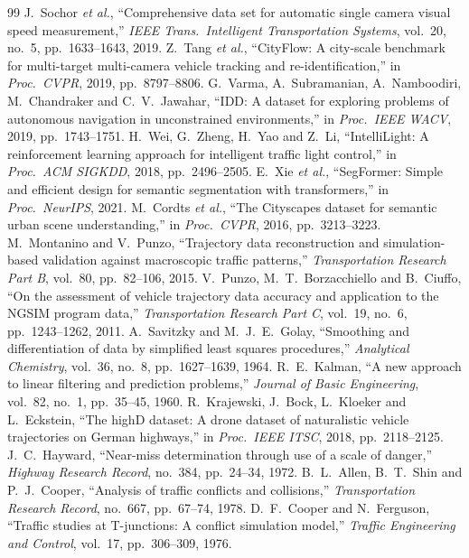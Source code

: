 \documentclass[11pt,a4paper]{article}
\begin{document}
\begin{thebibliography}{99}
 J.~Sochor \emph{et al.}, ``Comprehensive data set for automatic single camera visual speed measurement,'' \emph{IEEE Trans.\ Intelligent Transportation Systems}, vol.~20, no.~5, pp.~1633--1643, 2019.
 Z.~Tang \emph{et al.}, ``CityFlow: A city-scale benchmark for multi-target multi-camera vehicle tracking and re-identification,'' in \emph{Proc.\ CVPR}, 2019, pp.~8797--8806.
 G.~Varma, A.~Subramanian, A.~Namboodiri, M.~Chandraker and C.~V.~Jawahar, ``IDD: A dataset for exploring problems of autonomous navigation in unconstrained environments,'' in \emph{Proc.\ IEEE WACV}, 2019, pp.~1743--1751.
 H.~Wei, G.~Zheng, H.~Yao and Z.~Li, ``IntelliLight: A reinforcement learning approach for intelligent traffic light control,'' in \emph{Proc.\ ACM SIGKDD}, 2018, pp.~2496--2505.
 E.~Xie \emph{et al.}, ``SegFormer: Simple and efficient design for semantic segmentation with transformers,'' in \emph{Proc.\ NeurIPS}, 2021.
 M.~Cordts \emph{et al.}, ``The Cityscapes dataset for semantic urban scene understanding,'' in \emph{Proc.\ CVPR}, 2016, pp.~3213--3223.
 M.~Montanino and V.~Punzo, ``Trajectory data reconstruction and simulation-based validation against macroscopic traffic patterns,'' \emph{Transportation Research Part B}, vol.~80, pp.~82--106, 2015.
 V.~Punzo, M.~T.~Borzacchiello and B.~Ciuffo, ``On the assessment of vehicle trajectory data accuracy and application to the NGSIM program data,'' \emph{Transportation Research Part C}, vol.~19, no.~6, pp.~1243--1262, 2011.
 A.~Savitzky and M.~J.~E.~Golay, ``Smoothing and differentiation of data by simplified least squares procedures,'' \emph{Analytical Chemistry}, vol.~36, no.~8, pp.~1627--1639, 1964.
 R.~E.~Kalman, ``A new approach to linear filtering and prediction problems,'' \emph{Journal of Basic Engineering}, vol.~82, no.~1, pp.~35--45, 1960.
 R.~Krajewski, J.~Bock, L.~Kloeker and L.~Eckstein, ``The highD dataset: A drone dataset of naturalistic vehicle trajectories on German highways,'' in \emph{Proc.\ IEEE ITSC}, 2018, pp.~2118--2125.
 J.~C.~Hayward, ``Near-miss determination through use of a scale of danger,'' \emph{Highway Research Record}, no.~384, pp.~24--34, 1972.
 B.~L.~Allen, B.~T.~Shin and P.~J.~Cooper, ``Analysis of traffic conflicts and collisions,'' \emph{Transportation Research Record}, no.~667, pp.~67--74, 1978.
 D.~F.~Cooper and N.~Ferguson, ``Traffic studies at T-junctions: A conflict simulation model,'' \emph{Traffic Engineering and Control}, vol.~17, pp.~306--309, 1976.

\end{thebibliography}
\end{document}

